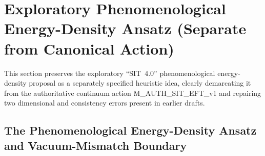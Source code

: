 \documentclass[american,11pt,letterpaper]{article}
\def\texttt#1{#1}%
\def\emph#1{#1}%
\begin{document}
\section{Exploratory Phenomenological Energy-Density Ansatz (Separate from Canonical Action)}
\label{sec:informational_energy_equivalence}

This section preserves the exploratory ``SIT~4.0'' phenomenological energy-density proposal as a \emph{separately specified heuristic idea}, clearly demarcating it from the authoritative continuum action \texttt{M\_AUTH\_SIT\_EFT\_v1} and repairing two dimensional and consistency errors present in earlier drafts.

\subsection{The Phenomenological Energy-Density Ansatz and Vacuum-Mismatch Boundary}
\end{document}
